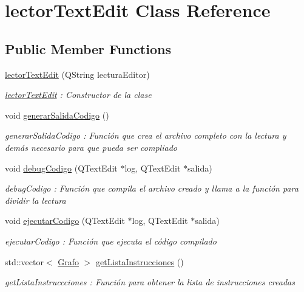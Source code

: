 \hypertarget{classlector_text_edit}{}\section{lector\+Text\+Edit Class Reference}
\label{classlector_text_edit}
\subsection*{Public Member Functions}
\begin{DoxyCompactItemize}
\item 
\hyperlink{classlector_text_edit_ab51fd4476ddce374786d73c63102ff3f}{lector\+Text\+Edit} (Q\+String lectura\+Editor)
\begin{DoxyCompactList}\small\item\em \hyperlink{classlector_text_edit}{lector\+Text\+Edit} \+: Constructor de la clase \end{DoxyCompactList}\item 
void \hyperlink{classlector_text_edit_ae932e45ec47d7f071801bccb67a5d2c6}{generar\+Salida\+Codigo} ()\hypertarget{classlector_text_edit_ae932e45ec47d7f071801bccb67a5d2c6}{}\label{classlector_text_edit_ae932e45ec47d7f071801bccb67a5d2c6}

\begin{DoxyCompactList}\small\item\em generar\+Salida\+Codigo \+: Función que crea el archivo completo con la lectura y demás necesario para que pueda ser compliado \end{DoxyCompactList}\item 
void \hyperlink{classlector_text_edit_a030f6cee0e4ad2ef480bf22d309ff582}{debug\+Codigo} (Q\+Text\+Edit $\ast$log, Q\+Text\+Edit $\ast$salida)
\begin{DoxyCompactList}\small\item\em debug\+Codigo \+: Función que compila el archivo creado y llama a la función para dividir la lectura \end{DoxyCompactList}\item 
void \hyperlink{classlector_text_edit_a7ef0e65f4e181843f30f524196187133}{ejecutar\+Codigo} (Q\+Text\+Edit $\ast$log, Q\+Text\+Edit $\ast$salida)
\begin{DoxyCompactList}\small\item\em ejecutar\+Codigo \+: Función que ejecuta el código compilado \end{DoxyCompactList}\item 
std\+::vector$<$ \hyperlink{class_grafo}{Grafo} $>$ \hyperlink{classlector_text_edit_ae4e571a49411081e19cd5342e33ad792}{get\+Lista\+Instrucciones} ()
\begin{DoxyCompactList}\small\item\em get\+Lista\+Instruccciones \+: Función para obtener la lista de instrucciones creadas \end{DoxyCompactList}\end{DoxyCompactItemize}


